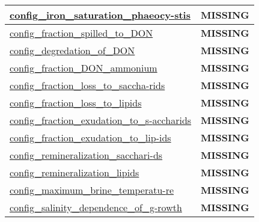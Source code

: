 {\begin{center}
\begin{longtable}{| p{2.0in} || p{4.0in} |}
    \hline
    \hyperref[subsec:nm_sec_config_iron_saturation_phaeocystis]{config\_iron\_saturation\_phaeocy-}\hyperref[subsec:nm_sec_config_iron_saturation_phaeocystis]{stis}& {\bf \color{red} MISSING} \\
    \hline
    \hyperref[subsec:nm_sec_config_fraction_spilled_to_DON]{config\_fraction\_spilled\_to\_DON} & {\bf \color{red} MISSING} \\
    \hline
    \hyperref[subsec:nm_sec_config_degredation_of_DON]{config\_degredation\_of\_DON} & {\bf \color{red} MISSING} \\
    \hline
    \hyperref[subsec:nm_sec_config_fraction_DON_ammonium]{config\_fraction\_DON\_ammonium} & {\bf \color{red} MISSING} \\
    \hline
    \hyperref[subsec:nm_sec_config_fraction_loss_to_saccharids]{config\_fraction\_loss\_to\_saccha-}\hyperref[subsec:nm_sec_config_fraction_loss_to_saccharids]{rids}& {\bf \color{red} MISSING} \\
    \hline
    \hyperref[subsec:nm_sec_config_fraction_loss_to_lipids]{config\_fraction\_loss\_to\_lipids} & {\bf \color{red} MISSING} \\
    \hline
    \hyperref[subsec:nm_sec_config_fraction_exudation_to_saccharids]{config\_fraction\_exudation\_to\_s-}\hyperref[subsec:nm_sec_config_fraction_exudation_to_saccharids]{accharids}& {\bf \color{red} MISSING} \\
    \hline
    \hyperref[subsec:nm_sec_config_fraction_exudation_to_lipids]{config\_fraction\_exudation\_to\_lip-}\hyperref[subsec:nm_sec_config_fraction_exudation_to_lipids]{ids}& {\bf \color{red} MISSING} \\
    \hline
    \hyperref[subsec:nm_sec_config_remineralization_saccharids]{config\_remineralization\_sacchari-}\hyperref[subsec:nm_sec_config_remineralization_saccharids]{ds}& {\bf \color{red} MISSING} \\
    \hline
    \hyperref[subsec:nm_sec_config_remineralization_lipids]{config\_remineralization\_lipids} & {\bf \color{red} MISSING} \\
    \hline
    \hyperref[subsec:nm_sec_config_maximum_brine_temperature]{config\_maximum\_brine\_temperatu-}\hyperref[subsec:nm_sec_config_maximum_brine_temperature]{re}& {\bf \color{red} MISSING} \\
    \hline
    \hyperref[subsec:nm_sec_config_salinity_dependence_of_growth]{config\_salinity\_dependence\_of\_g-}\hyperref[subsec:nm_sec_config_salinity_dependence_of_growth]{rowth}& {\bf \color{red} MISSING} \\

\end{longtable}
\end{center}}
